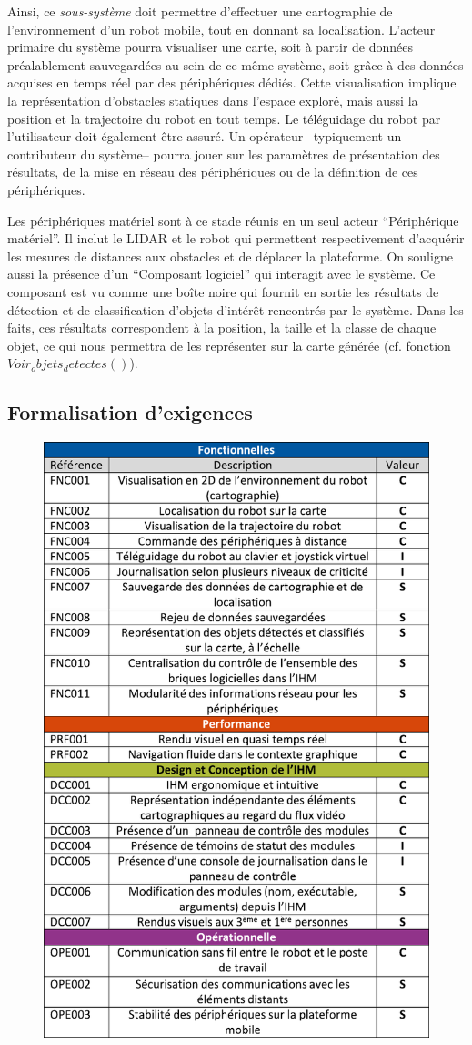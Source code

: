 Ainsi, ce \emph{sous-système} doit permettre d'effectuer une cartographie de l'environnement d'un robot mobile, tout en donnant sa localisation. 
L'acteur primaire du système pourra visualiser une carte, soit à partir de données préalablement sauvegardées au sein de ce même système, soit grâce à des données acquises en temps réel par des périphériques dédiés. 
Cette visualisation implique la représentation d'obstacles statiques dans l'espace exploré, mais aussi la position et la trajectoire du robot en tout temps.
Le téléguidage du robot par l'utilisateur doit également être assuré. 
Un opérateur --typiquement un contributeur du système-- pourra jouer sur les paramètres de présentation des résultats, de la mise en réseau des périphériques ou de la définition de ces périphériques. 

Les périphériques matériel sont à ce stade réunis en un seul acteur ``Périphérique matériel''.
Il inclut le LIDAR et le robot qui permettent respectivement d'acquérir les mesures de distances aux obstacles et de déplacer la plateforme.
On souligne aussi la présence d'un ``Composant logiciel'' qui interagit avec le système.
Ce composant est vu comme une boîte noire qui fournit en sortie les résultats de détection et de classification d'objets d'intérêt rencontrés par le système.
Dans les faits, ces résultats correspondent à la position, la taille et la \gls{classe} de chaque objet, ce qui nous permettra de les représenter sur la carte générée (cf. fonction $Voir_objets_detectes()$).

\subsection{Formalisation d'exigences}

\begin{figure}[h]
  \centering
    \includegraphics[width=.65\linewidth]{figures/exigences}  
  \label{fig:exigences}
\end{figure}

